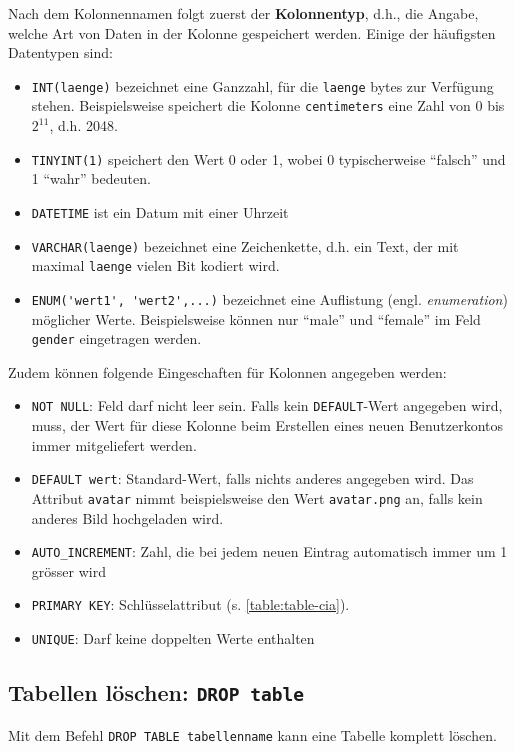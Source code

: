 Nach dem Kolonnennamen folgt zuerst der \textbf{Kolonnentyp}, d.h., die Angabe, welche Art von Daten in der Kolonne gespeichert werden. Einige der häufigsten Datentypen sind:
\begin{itemize}
  \item \lstinline[style=sql]|INT(laenge)| bezeichnet eine Ganzzahl, für die \texttt{laenge} bytes zur Verfügung stehen. Beispielsweise speichert die Kolonne \texttt{centimeters} eine Zahl von 0 bis $2^{11}$, d.h. 2048.
  \item \lstinline[style=sql]|TINYINT(1)| speichert den Wert 0 oder 1, wobei 0 typischerweise ``falsch'' und 1 ``wahr'' bedeuten.
  \item \lstinline[style=sql]|DATETIME| ist ein Datum mit einer Uhrzeit
  \item \lstinline[style=sql]|VARCHAR(laenge)| bezeichnet eine Zeichenkette, d.h. ein Text, der mit maximal \texttt{laenge} vielen Bit kodiert wird.
  \item \lstinline[style=sql]|ENUM('wert1', 'wert2',...)| bezeichnet eine Auflistung (engl. \textit{enumeration}) möglicher Werte. Beispielsweise können nur ``male'' und ``female'' im Feld \texttt{gender} eingetragen werden.
\end{itemize}

Zudem können folgende Eingeschaften für Kolonnen angegeben werden:

\begin{itemize}
  \item \lstinline[style=sql]|NOT NULL|: Feld darf nicht leer sein. Falls kein \lstinline[style=sql]|DEFAULT|-Wert angegeben wird, muss, der Wert für diese Kolonne beim Erstellen eines neuen Benutzerkontos immer mitgeliefert werden.
  \item \lstinline[style=sql]|DEFAULT wert|: Standard-Wert, falls nichts anderes angegeben wird. Das Attribut \texttt{avatar} nimmt beispielsweise den Wert \texttt{avatar.png} an, falls kein anderes Bild hochgeladen wird.
  \item \lstinline[style=sql]|AUTO_INCREMENT|: Zahl, die bei jedem neuen Eintrag automatisch immer um 1 grösser wird
  \item \lstinline[style=sql]|PRIMARY KEY|: Schlüsselattribut (s. \cref{table:table-cia}).
  \item \lstinline[style=sql]|UNIQUE|: Darf keine doppelten Werte enthalten
\end{itemize}

\subsection{Tabellen löschen: \texorpdfstring{\lstinline[style=sql]|DROP table|}{DROP table}}
Mit dem Befehl \lstinline[style=sql]|DROP TABLE tabellenname| kann eine Tabelle komplett löschen.

